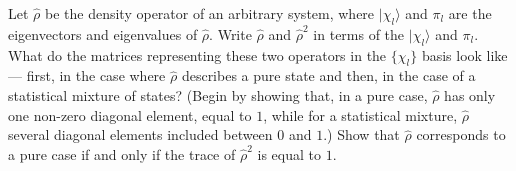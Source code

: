 \documentclass[12pt,a4paper]{article}
\newenvironment{problem}[2][Problem]{\begin{trivlist}
\item[\hskip \labelsep {\bfseries #1}\hskip \labelsep {\bfseries #2.}]}{\end{trivlist}}
\begin{document}
\begin{problem}{5}
[C-T Exercise 3-17] Let $\hat{\rho}$ be the density operator of an arbitrary system, where $|\chi_l\rangle$ and $\pi_l$ are the eigenvectors and eigenvalues of $\hat{\rho}$. Write $\hat{\rho}$ and $\hat{\rho}^2$ in terms of the $|\chi_l\rangle$ and $\pi_l$. What do the matrices representing these two operators in the $\{\chi_l\}$ basis look like --- first, in the case where $\hat{\rho}$ describes a pure state and then, in the case of a statistical mixture of states? (Begin by showing that, in a pure case, $\hat{\rho}$ has only one non-zero diagonal element, equal to $1$, while for a statistical mixture, $\hat{\rho}$ several diagonal elements included between $0$ and $1$.) Show that $\hat{\rho}$ corresponds to a pure case if and only if the trace of $\hat{\rho}^2$ is equal to $1$.
\end{problem}
\end{document}
